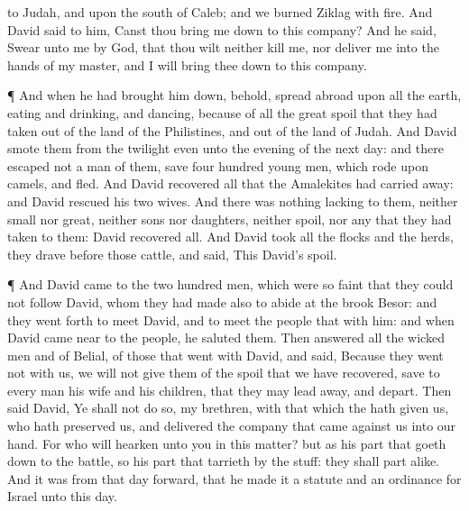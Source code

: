 {{} to
Judah, and upon the
south of
Caleb; and we
burned
Ziklag with
fire.
And
David
said to him, Canst thou bring me
down to this
company? And he
said,
Swear unto me by
God, that thou wilt neither
kill me,
nor
deliver me into the
hands of my
master, and I will bring thee
down to this
company.
\par }{\PP {}¶ And when he had brought him
down, behold,
{} spread
abroad upon
all the
earth,
eating and
drinking, and
dancing, because of all the
great
spoil that they had
taken out of the
land of the
Philistines, and out of the
land of
Judah.
And
David
smote them from the
twilight even unto the
evening of the next
day: and there
escaped not a
man of them, save
four
hundred
young
men, which
rode upon
camels, and
fled.
And
David
recovered all that the
Amalekites had carried
away: and
David
rescued his
two
wives.
And there was nothing
lacking to them,
neither
small nor
great, neither
sons nor
daughters, neither
spoil, nor any
{} that they had
taken to them:
David
recovered all.
And
David
took all the
flocks and the
herds,
{} they
drave
before
those
{}
cattle, and
said, This
{}
David’s
spoil.
\par }{\PP {}¶ And
David
came to the two
hundred
men, which were so
faint that they could not
follow
David, whom they had made also to
abide at the
brook
Besor: and they went
forth to
meet
David, and to
meet the
people that
{} with him: and when
David came
near to the
people, he
saluted them.
Then
answered all the
wicked
men and
{} of
Belial, of
those that
went with
David, and
said, Because they
went not with us, we will not
give them
{} of the
spoil that we have
recovered, save to every
man his
wife and his
children, that they may lead
{}
away, and
depart.
Then
said
David, Ye shall not do
so, my
brethren, with that which the
{} hath
given us, who hath
preserved us, and
delivered the
company that
came against us into our
hand.
For who will
hearken unto you in this
matter? but as his
part
{} that goeth
down to the
battle, so
{} his
part
{} that
tarrieth by the
stuff: they shall
part
alike.
And it was
{} from that
day
forward, that he
made it a
statute and an
ordinance for
Israel unto this
day.
}
